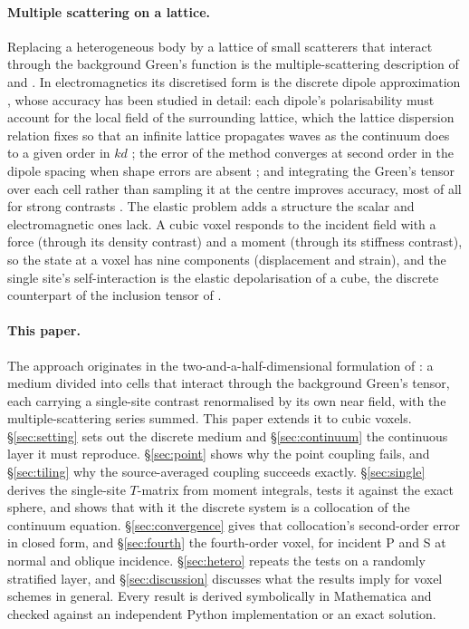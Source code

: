\documentclass[extra,mreferee]{gji}
\begin{document}
\paragraph{Multiple scattering on a lattice.} Replacing a heterogeneous body by a lattice of small scatterers that interact through the background
Green's function is the multiple-scattering description of \citet{Foldy1945} and \citet{Lax1951}.
In electromagnetics its discretised form is the discrete dipole approximation
\citep[DDA;][]{Purcell1973,Draine1994}, whose accuracy has been studied in detail: each dipole's
polarisability must account for the local field of the surrounding lattice, which the lattice
dispersion relation fixes so that an infinite lattice propagates waves as the continuum does to a
given order in $kd$ \citep{Draine1993}; the error of the method converges at second order in the
dipole spacing when shape errors are absent \citep{Yurkin2006}; and integrating the Green's tensor
over each cell rather than sampling it at the centre improves accuracy, most of all for strong
contrasts \citep{Chaumet2004}. The elastic problem adds a structure the scalar and electromagnetic
ones lack. A cubic voxel responds to the incident field with a force (through its density contrast)
and a moment (through its stiffness contrast), so the state at a voxel has nine components
(displacement and strain), and the single site's self-interaction is the elastic depolarisation of
a cube, the discrete counterpart of the inclusion tensor of \citet{Eshelby1957}.

\paragraph{This paper.} The approach originates in the two-and-a-half-dimensional formulation of
\citet{Nestor1996}: a medium divided into cells that interact through the background Green's tensor,
each carrying a single-site contrast renormalised by its own near field, with the multiple-scattering
series summed. This paper extends it to cubic voxels. \S\ref{sec:setting} sets out the discrete medium
and \S\ref{sec:continuum} the continuous layer it must reproduce. \S\ref{sec:point} shows why the
point coupling fails, and \S\ref{sec:tiling} why the source-averaged coupling succeeds exactly.
\S\ref{sec:single} derives the single-site $T$-matrix from moment integrals, tests it against the exact
sphere, and shows that with it the discrete system is a collocation of the continuum equation.
\S\ref{sec:convergence} gives that collocation's second-order error in closed form, and
\S\ref{sec:fourth} the fourth-order voxel, for incident P and S at normal and oblique incidence.
\S\ref{sec:hetero} repeats the tests on a randomly stratified layer, and \S\ref{sec:discussion} discusses
what the results imply for voxel schemes in general. Every result is derived symbolically in
Mathematica and checked against an independent Python implementation or an exact solution.
\end{document}
